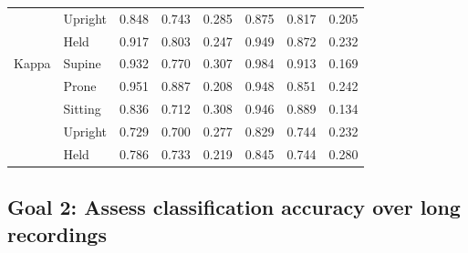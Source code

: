 \documentclass[
  man]{apa6}
\begin{document}
\begin{table}[tbp]
\begin{center}
\begin{threeparttable}
\begin{tabular}{llllllll}
 & Upright & 0.848 & 0.743 & 0.285 & 0.875 & 0.817 & 0.205\\
 & Held & 0.917 & 0.803 & 0.247 & 0.949 & 0.872 & 0.232\\ \midrule
Kappa & Supine & 0.932 & 0.770 & 0.307 & 0.984 & 0.913 & 0.169\\
 & Prone & 0.951 & 0.887 & 0.208 & 0.948 & 0.851 & 0.242\\
 & Sitting & 0.836 & 0.712 & 0.308 & 0.946 & 0.889 & 0.134\\
 & Upright & 0.729 & 0.700 & 0.277 & 0.829 & 0.744 & 0.232\\
 & Held & 0.786 & 0.733 & 0.219 & 0.845 & 0.744 & 0.280\\
\bottomrule
\end{tabular}

\end{threeparttable}
\end{center}

\end{table}

\hypertarget{goal-2-assess-classification-accuracy-over-long-recordings}{%
\subsection{Goal 2: Assess classification accuracy over long recordings}\label{goal-2-assess-classification-accuracy-over-long-recordings}}
\end{document}
